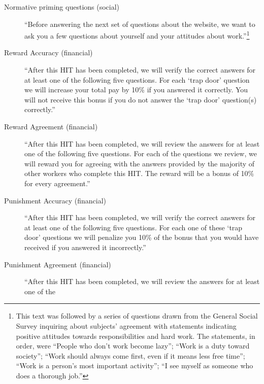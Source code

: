 \documentclass{chi2009}
\begin{document}
{\begin{description}
\item[Normative priming questions (social)] ``Before answering the next
  set of questions about the website, we want to ask you a few
  questions about yourself and your attitudes about
  work.''\footnote{This text was followed by a series of questions drawn from the General Social Survey inquiring about subjects' agreement with statements indicating positive attitudes towards responsibilities and hard work. The statements, in order, were ``People who don't work become lazy''; ``Work is a duty toward society''; ``Work should always come first, even if it means less free time''; ``Work is a person's most important activity''; ``I see myself as someone who does a thorough job.''} %
\item[Reward Accuracy (financial)] ``After this HIT has been completed,
  we will verify the correct answers for at least one of the following
  five questions. For each `trap door' question we will increase your
  total pay by 10\% if you answered it correctly. You will not receive
  this bonus if you do not answer the `trap door' question(s)
  correctly.'' %
\item[Reward Agreement (financial)] ``After this HIT has been
  completed, we will review the answers for at least one of the
  following five questions. For each of the questions we review, we
  will reward you for agreeing with the answers provided by the
  majority of other workers who complete this HIT. The reward will be
  a bonus of 10\% for every agreement.'' %
\item[Punishment Accuracy (financial)] ``After this HIT has been
  completed, we will verify the correct answers for at least one of
  the following five questions. For each one of these `trap door'
  questions we will penalize you 10\% of the bonus that you would have
  received if you answered it incorrectly.'' %
\item[Punishment Agreement (financial)] ``After this HIT has been
  completed, we will review the answers for at least one of the

\end{description}}
\end{document}
